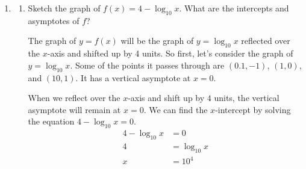 \documentclass{article}
\begin{document}
\begin{enumerate}[resume]
\begin{enumerate}
  \end{enumerate}

\item 
  \begin{enumerate}
  \item
    \begin{problem}[\stretch{2}]
      Sketch the graph of $f(x) = 4 - \log_{10} x$.  What are the intercepts
      and asymptotes of $f$?
    \end{problem}

    \begin{solution}
      The graph of $y=f(x)$ will be the graph of $y=\log_{10} x$
      reflected over the $x$-axis and shifted up by 4 units. So first,
      let's consider the graph of $y=\log_{10} x$. Some of the points
      it passes through are $(0.1, -1)$, $(1, 0)$, and $(10, 1)$.
      It has a vertical asymptote at $x=0$.
      \begin{center}
      \end{center}

     When we reflect over the $x$-axis and shift up by $4$ units,
     the vertical asymptote will remain at $x=0$. We can find
     the $x$-intercept by solving the equation $4-\log_{10} x = 0$.
     \begin{align*}
      4-\log_{10} x &= 0 \\
      4 &= \log_{10} x \\
      x &= 10^4
     \end{align*}
      \begin{center}
      \end{center}
    \end{solution}


\end{enumerate}
\end{enumerate}
\end{document}
